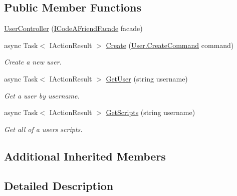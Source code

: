 \subsection*{Public Member Functions}
\begin{DoxyCompactItemize}
\item 
\mbox{\hyperlink{class_code_a_friend_1_1_api_service_1_1_controllers_1_1_user_controller_a62af772aa676edcc545ffb0aa0cb9bc9}{User\+Controller}} (\mbox{\hyperlink{interface_code_a_friend_1_1_facade_1_1_i_code_a_friend_facade}{I\+Code\+A\+Friend\+Facade}} facade)
\item 
async Task$<$ I\+Action\+Result $>$ \mbox{\hyperlink{class_code_a_friend_1_1_api_service_1_1_controllers_1_1_user_controller_acd97e404e641c3acfe8a0b5d4a34e4ef}{Create}} (\mbox{\hyperlink{class_code_a_friend_1_1_data_model_1_1_user_1_1_create_command}{User.\+Create\+Command}} command)
\begin{DoxyCompactList}\small\item\em Create a new user. \end{DoxyCompactList}\item 
async Task$<$ I\+Action\+Result $>$ \mbox{\hyperlink{class_code_a_friend_1_1_api_service_1_1_controllers_1_1_user_controller_aa4579aedefb04bb5916153a2bb9f42a2}{Get\+User}} (string username)
\begin{DoxyCompactList}\small\item\em Get a user by username. \end{DoxyCompactList}\item 
async Task$<$ I\+Action\+Result $>$ \mbox{\hyperlink{class_code_a_friend_1_1_api_service_1_1_controllers_1_1_user_controller_a2bcc77065fde0735cf40b6cb38ce97d3}{Get\+Scripts}} (string username)
\begin{DoxyCompactList}\small\item\em Get all of a user\textquotesingle{}s scripts. \end{DoxyCompactList}\end{DoxyCompactItemize}
\subsection*{Additional Inherited Members}


\subsection{Detailed Description}




